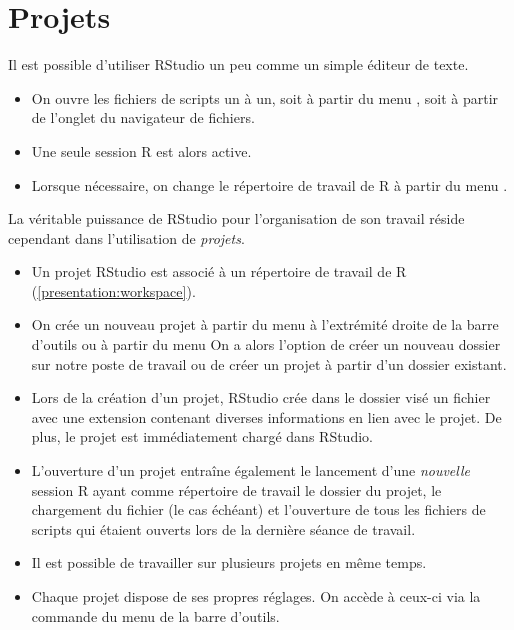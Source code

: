 \section{Projets}
\label{sec:rstudio:projets}

Il est possible d'utiliser RStudio un peu comme un simple éditeur de
texte.
\begin{itemize}
\item On ouvre les fichiers de scripts un à un, soit à partir du menu
  , soit à partir de l'onglet  du
  navigateur de fichiers.
\item Une seule session R est alors active.
\item Lorsque nécessaire, on change le répertoire de travail de R à
  partir du menu .
\end{itemize}

La véritable puissance de RStudio pour l'organisation de son travail
réside cependant dans l'utilisation de \emph{projets}.
\begin{itemize}
\item Un projet RStudio est associé à un répertoire de travail de R
  (\autoref{presentation:workspace}).
\item On crée un nouveau projet à partir du menu  à
  l'extrémité droite de la barre d'outils ou à partir du menu
   On a alors l'option de créer un nouveau
  dossier sur notre poste de travail ou de créer un projet à partir
  d'un dossier existant.
\item Lors de la création d'un projet, RStudio crée dans le dossier
  visé un fichier avec une extension  contenant diverses
  informations en lien avec le projet. De plus, le projet est
  immédiatement chargé dans RStudio.
\item L'ouverture d'un projet entraîne également le lancement d'une
  \emph{nouvelle} session R ayant comme répertoire de travail le
  dossier du projet, le chargement du fichier  (le cas
  échéant) et l'ouverture de tous les fichiers de scripts qui étaient
  ouverts lors de la dernière séance de travail.
\item Il est possible de travailler sur plusieurs projets en même
  temps.
\item Chaque projet dispose de ses propres réglages. On accède à
  ceux-ci via la commande  du menu
   de la barre d'outils.
\end{itemize}


